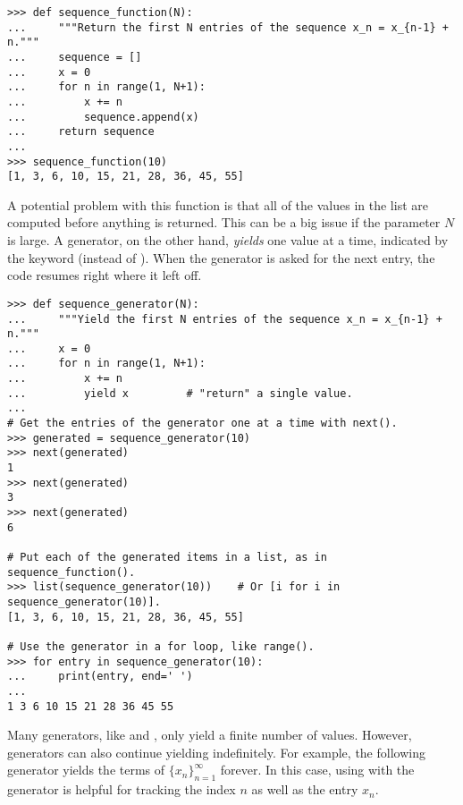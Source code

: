 \begin{lstlisting}
>>> def sequence_function(N):
...     """Return the first N entries of the sequence x_n = x_{n-1} + n."""
...     sequence = []
...     x = 0
...     for n in range(1, N+1):
...         x += n
...         sequence.append(x)
...     return sequence
...
>>> sequence_function(10)
[1, 3, 6, 10, 15, 21, 28, 36, 45, 55]
\end{lstlisting}

A potential problem with this function is that all of the values in the list are computed before anything is returned.
This can be a big issue if the parameter $N$ is large.
A generator, on the other hand, \emph{yields} one value at a time, indicated by the keyword  (instead of ).
When the generator is asked for the next entry, the code resumes right where it left off.

\begin{lstlisting}
>>> def sequence_generator(N):
...     """Yield the first N entries of the sequence x_n = x_{n-1} + n."""
...     x = 0
...     for n in range(1, N+1):
...         x += n
...         yield x         # "return" a single value.
...
# Get the entries of the generator one at a time with next().
>>> generated = sequence_generator(10)
>>> next(generated)
1
>>> next(generated)
3
>>> next(generated)
6

# Put each of the generated items in a list, as in sequence_function().
>>> list(sequence_generator(10))    # Or [i for i in sequence_generator(10)].
[1, 3, 6, 10, 15, 21, 28, 36, 45, 55]

# Use the generator in a for loop, like range().
>>> for entry in sequence_generator(10):
...     print(entry, end=' ')
...
1 3 6 10 15 21 28 36 45 55
\end{lstlisting}

Many generators, like  and , only yield a finite number of values.
However, generators can also continue yielding indefinitely.
For example, the following generator yields the terms of $\{x_n\}_{n=1}^\infty$ forever.
In this case, using  with the generator is helpful for tracking the index $n$ as well as the entry $x_n$.

